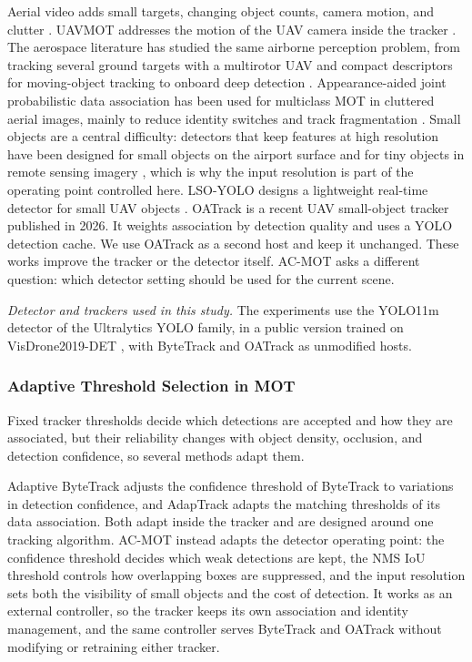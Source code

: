 \documentclass[journal]{new-aiaa}
\begin{document}
Aerial video adds small targets, changing object counts, camera motion, and
clutter \cite{zhu2022visdrone,du2018uavdt}. UAVMOT addresses the motion of the
UAV camera inside the tracker \cite{liu2022uavmot}. The aerospace literature has
studied the same airborne perception problem, from tracking several ground
targets with a multirotor UAV \cite{miller2015multitarget} and compact
descriptors for moving-object tracking \cite{desai2017uavfeature} to onboard
deep detection \cite{lu2024uavdetection,choi2022docking}. Appearance-aided
joint probabilistic data association has been used for multiclass MOT in
cluttered aerial images, mainly to reduce identity switches and track
fragmentation \cite{kim2024afjpda}. Small objects are a central difficulty:
detectors that keep features at high resolution have been designed for small
objects on the airport surface \cite{huang2022airportsmall} and for tiny
objects in remote sensing imagery \cite{fathy2026toren}, which is why the
input resolution is part of the operating point controlled here. LSO-YOLO designs a
lightweight real-time detector for small UAV objects \cite{dai2026lsoyolo}.
OATrack \cite{qi2026oatrack} is a recent UAV small-object tracker published in
2026. It weights association by detection quality and uses a YOLO detection
cache. We use OATrack as a second host and keep it unchanged. These works improve the tracker or the detector
itself. AC-MOT asks a different question: which detector setting should be
used for the current scene.

\emph{Detector and trackers used in this study.} The experiments use the
YOLO11m detector \cite{jocher2024yolo11} of the Ultralytics YOLO family, in a
public version trained on VisDrone2019-DET \cite{zhu2022visdrone}, with
ByteTrack \cite{zhang2022bytetrack} and OATrack \cite{qi2026oatrack} as
unmodified hosts.

\subsubsection{Adaptive Threshold Selection in MOT}
Fixed tracker thresholds decide which detections are accepted and how they
are associated, but their reliability changes with object density,
occlusion, and detection confidence, so several methods adapt them.

Adaptive ByteTrack adjusts the confidence threshold of ByteTrack
\cite{ma2023adaptivebytetrack} to variations in detection confidence, and
AdapTrack \cite{shim2024adaptrack} adapts the matching thresholds of its data
association. Both adapt inside the tracker and are designed around one
tracking algorithm. AC-MOT instead adapts the detector operating point: the
confidence threshold decides which weak detections are kept, the NMS IoU
threshold controls how overlapping boxes are suppressed, and the input
resolution sets both the visibility of small objects and the cost of
detection. It works as an external controller, so the tracker keeps its own
association and identity management, and the same controller serves
ByteTrack and OATrack without modifying or retraining either tracker.
\end{document}
